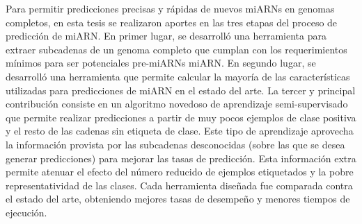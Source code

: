 Para permitir predicciones precisas y rápidas de nuevos miARNs en genomas completos, en esta tesis se realizaron aportes en las tres etapas del proceso de
predicción de miARN.  En primer lugar, se desarrolló una herramienta para extraer subcadenas de un genoma completo que cumplan con los requerimientos mínimos
para ser potenciales pre-miARNs miARN. En segundo lugar, se desarrolló una herramienta que permite calcular la mayoría de las características utilizadas para
predicciones de miARN en el estado del arte. La tercer y principal contribución consiste en un algoritmo novedoso de aprendizaje semi-supervisado que permite
realizar predicciones a partir de muy pocos ejemplos de clase positiva y el resto de las cadenas sin etiqueta de clase. Este tipo de aprendizaje aprovecha la
información provista por las subcadenas desconocidas (sobre las que se desea generar predicciones) para mejorar las tasas de predicción. Esta información extra
permite atenuar el efecto del número reducido de ejemplos etiquetados y la pobre representatividad de las clases. Cada herramienta diseñada fue comparada contra
el estado del arte, obteniendo mejores tasas de desempeño y menores tiempos de ejecución.

\newpage
\thispagestyle{empty}
